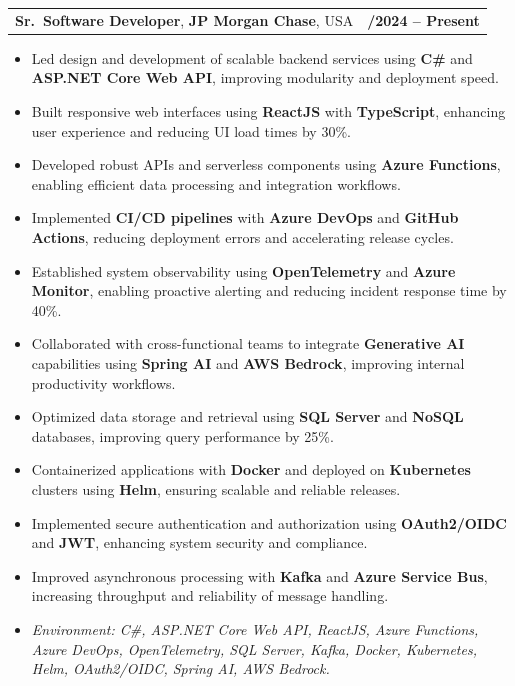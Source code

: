 \documentclass[letterpaper,11pt]{article}
\makeatletter
\newcommand{\resumeItem}[1]{
  \item\footnotesize{
    {#1 \vspace{-2pt}}
  }
}
\newcommand{\resumeSubheading}[4]{
  \vspace{-2pt}\item
    \begin{tabular*}{1.0\textwidth}[t]{l@{\extracolsep{\fill}}r}
      \textbf{\fontsize{10pt}{14pt}\selectfont #3}, \textbf{\fontsize{10pt}{14pt}\selectfont #1}, \fontsize{10pt}{14pt}\selectfont #4 & \textbf{\fontsize{10pt}{14pt}\selectfont #2} \\
    \end{tabular*}\vspace{-7pt}
}
\newcommand{\resumeItemListStart}{\begin{itemize}[leftmargin=*]}
\newcommand{\resumeItemListEnd}{\end{itemize}\vspace{-5pt}}
\makeatother
\begin{document}
\resumeSubheading
{JP Morgan Chase}{09/2024 -- Present}
{Sr.\ Software Developer}{USA}
\resumeItemListStart
  \resumeItem{Led design and development of scalable backend services using \textbf{C\#} and \textbf{ASP.NET Core Web API}, improving modularity and deployment speed.}
  \resumeItem{Built responsive web interfaces using \textbf{ReactJS} with \textbf{TypeScript}, enhancing user experience and reducing UI load times by 30\%.}
  \resumeItem{Developed robust APIs and serverless components using \textbf{Azure Functions}, enabling efficient data processing and integration workflows.}
  \resumeItem{Implemented \textbf{CI/CD pipelines} with \textbf{Azure DevOps} and \textbf{GitHub Actions}, reducing deployment errors and accelerating release cycles.}
  \resumeItem{Established system observability using \textbf{OpenTelemetry} and \textbf{Azure Monitor}, enabling proactive alerting and reducing incident response time by 40\%.}
  \resumeItem{Collaborated with cross-functional teams to integrate \textbf{Generative AI} capabilities using \textbf{Spring AI} and \textbf{AWS Bedrock}, improving internal productivity workflows.}
  \resumeItem{Optimized data storage and retrieval using \textbf{SQL Server} and \textbf{NoSQL} databases, improving query performance by 25\%.}
  \resumeItem{Containerized applications with \textbf{Docker} and deployed on \textbf{Kubernetes} clusters using \textbf{Helm}, ensuring scalable and reliable releases.}
  \resumeItem{Implemented secure authentication and authorization using \textbf{OAuth2/OIDC} and \textbf{JWT}, enhancing system security and compliance.}
  \resumeItem{Improved asynchronous processing with \textbf{Kafka} and \textbf{Azure Service Bus}, increasing throughput and reliability of message handling.}
  \resumeItem{\textit{Environment: C\#, ASP.NET Core Web API, ReactJS, Azure Functions, Azure DevOps, OpenTelemetry, SQL Server, Kafka, Docker, Kubernetes, Helm, OAuth2/OIDC, Spring AI, AWS Bedrock.}}
\resumeItemListEnd
\end{document}
